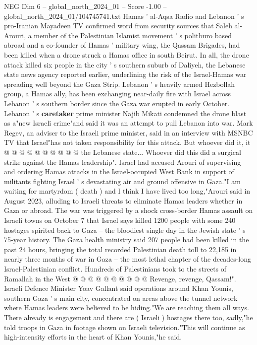 \begin{textsample}{NEG Dim 6 – global\_north\_2024\_01 – Score -1.00 – global\_north\_2024\_01/104745741.txt}  \label{ex:f6_neg_363}
Hamas ' al-Aqsa Radio and Lebanon ' s pro-Iranian Mayadeen TV confirmed word from security sources that Saleh al-Arouri, a member of the Palestinian Islamist movement ' s politburo based abroad and a co-founder of Hamas ' military wing, the Qassam Brigades, had been killed when a drone struck a Hamas office in south Beirut.
In all, the drone attack killed six people in the city ' s southern suburb of Daliyeh, the Lebanese state news agency reported earlier, underlining the risk of the Israel-Hamas war spreading well beyond the Gaza Strip.
Lebanon ' s heavily armed Hezbollah group, a Hamas ally, has been exchanging near-daily fire with Israel across Lebanon ' s southern border since the Gaza war erupted in early October.
Lebanon ' s \textbf{caretaker} prime minister Najib Mikati condemned the drone blast as a"new Israeli crime"and said it was an attempt to pull Lebanon into war.
Mark Regev, an adviser to the Israeli prime minister, said in an interview with MSNBC TV that Israel"has not taken responsibility for this attack.
But whoever did it, it @ @ @ @ @ @ @ @ @ @ the Lebanese state...
Whoever did this did a surgical strike against the Hamas leadership".
Israel had accused Arouri of supervising and ordering Hamas attacks in the Israel-occupied West Bank in support of militants fighting Israel ' s devastating air and ground offensive in Gaza."I am waiting for martyrdom ( death ) and I think I have lived too long,"Arouri said in August 2023, alluding to Israeli threats to eliminate Hamas leaders whether in Gaza or abroad.
The war was triggered by a shock cross-border Hamas assault on Israeli towns on October 7 that Israel says killed 1200 people with some 240 hostages spirited back to Gaza -- the bloodiest single day in the Jewish state ' s 75-year history.
The Gaza health ministry said 207 people had been killed in the past 24 hours, bringing the total recorded Palestinian death toll to 22,185 in nearly three months of war in Gaza -- the most lethal chapter of the decades-long Israel-Palestinian conflict.
Hundreds of Palestinians took to the streets of Ramallah in the West @ @ @ @ @ @ @ @ @ @ Revenge, revenge, Qassam!".
Israeli Defence Minister Yoav Gallant said operations around Khan Younis, southern Gaza ' s main city, concentrated on areas above the tunnel network where Hamas leaders were believed to be hiding."We are reaching them all ways.
There already is engagement and there are ( Israeli ) hostages there too, sadly,"he told troops in Gaza in footage shown on Israeli television."This will continue as high-intensity efforts in the heart of Khan Younis,"he said.

\end{textsample}
